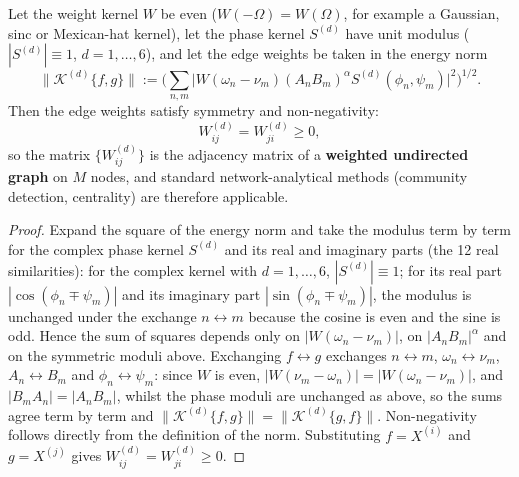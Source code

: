 \begin{lemma}\label{ch31_phase_network_symmetry}
Let the weight kernel $W$ be even ($W(-\Omega) = W(\Omega)$, for example a Gaussian, sinc or Mexican-hat kernel), let the phase kernel $S^{(d)}$ have unit modulus ($|S^{(d)}| \equiv 1$, $d = 1,\dots,6$), and let the edge weights be taken in the energy norm
\[
\big\|\mathcal{K}^{(d)}\{f,g\}\big\| := \Big( \sum_{n,m} \big| W(\omega_n - \nu_m) (A_n B_m)^{\alpha} S^{(d)}(\phi_n, \psi_m) \big|^2 \Big)^{1/2}.
\]
Then the edge weights satisfy symmetry and non-negativity:
\[
W_{ij}^{(d)} = W_{ji}^{(d)} \ge 0,
\]
so the matrix $\{W_{ij}^{(d)}\}$ is the adjacency matrix of a \textbf{weighted undirected graph} on $M$ nodes, and standard network-analytical methods (community detection, centrality) are therefore applicable.
\end{lemma}

\begin{proof}
Expand the square of the energy norm and take the modulus term by term for the complex phase kernel $S^{(d)}$ and its real and imaginary parts (the 12 real similarities): for the complex kernel with $d=1,\dots,6$, $|S^{(d)}| \equiv 1$; for its real part $|\cos(\phi_n \mp \psi_m)|$ and its imaginary part $|\sin(\phi_n \mp \psi_m)|$, the modulus is unchanged under the exchange $n \leftrightarrow m$ because the cosine is even and the sine is odd. Hence the sum of squares depends only on $|W(\omega_n - \nu_m)|$, on $|A_n B_m|^{\alpha}$ and on the symmetric moduli above. Exchanging $f \leftrightarrow g$ exchanges $n \leftrightarrow m$, $\omega_n \leftrightarrow \nu_m$, $A_n \leftrightarrow B_m$ and $\phi_n \leftrightarrow \psi_m$: since $W$ is even, $|W(\nu_m - \omega_n)| = |W(\omega_n - \nu_m)|$, and $|B_m A_n| = |A_n B_m|$, whilst the phase moduli are unchanged as above, so the sums agree term by term and $\|\mathcal{K}^{(d)}\{f,g\}\| = \|\mathcal{K}^{(d)}\{g,f\}\|$. Non-negativity follows directly from the definition of the norm. Substituting $f = X^{(i)}$ and $g = X^{(j)}$ gives $W_{ij}^{(d)} = W_{ji}^{(d)} \ge 0$.
\end{proof}

